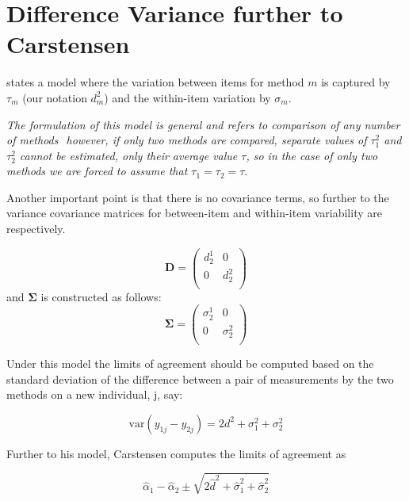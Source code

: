 \documentclass[12pt, a4paper]{report}
\theoremstyle{plain}
\theoremstyle{definition}
\theoremstyle{remark}
\begin{document}
\section{Difference Variance further to Carstensen}

\citet{BXC2008} states a model where the variation between items
for method $m$ is captured by $\tau_m$ (our notation $d^2_m$) and the within-item
variation by $\sigma_m$.

\emph{The formulation of this model is general and refers to comparison
	of any number of methods  however, if only two methods are
	compared, separate values of $\tau^2_1$ and $\tau^2_2$ cannot be
	estimated, only their average value $\tau$, so in the case of only
	two methods we are forced to assume that $\tau_1 = \tau_2 = \tau$}\citep{BXC2008}.

Another important point is that there is no covariance terms, so
further to  \citet{BXC2008} the variance covariance matrices for
between-item and within-item variability are respectively.

\[\boldsymbol{D} = \left(
\begin{array}{cc}
d^1_2  & 0 \\
0 & d^2_2 \\
\end{array}
\right) \]
and  $\boldsymbol{\Sigma}$ is constructed as follows:
\[\boldsymbol{\Sigma} = \left(
\begin{array}{cc}
\sigma^1_2  & 0 \\
0 & \sigma^2_2 \\
\end{array}
\right) \]


Under this model the limits of agreement should be computed based
on the standard deviation of the difference between a pair of
measurements by the two methods on a new individual, j, say:

\[ \mbox{var}(y_{1j} - y_{2j}) = 2d^2 + \sigma^2_1 + \sigma^2_2  \]

Further to his model, Carstensen computes the limits of agreement
as

\[
\hat{\alpha}_1 - \hat{\alpha}_2 \pm \sqrt{2 \hat{d}^2 + 	\hat{\sigma}^2_1 + \hat{\sigma}^2_2}
\]





%
\end{document}
